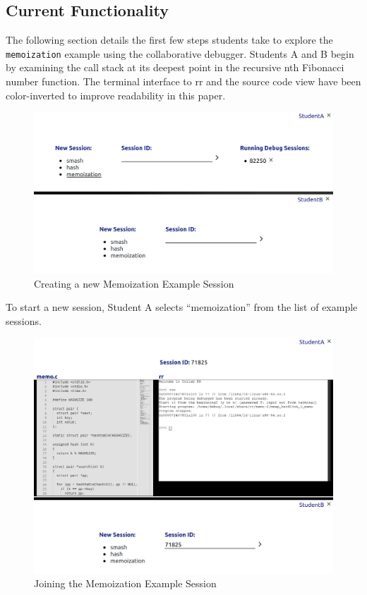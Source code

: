 \documentclass[12pt]{article}
\begin{document}
\subsection{Current Functionality}

The following section details the first few steps students take to
explore the \lstinline{memoization} example using the collaborative
debugger.  Students A and B begin by examining the call stack at its
deepest point in the recursive nth Fibonacci number function.  The
terminal interface to rr and the source code view have been
color-inverted to improve readability in this paper.

\begin{figure}[h!]

  \includegraphics[width=\textwidth]{session1i}
  \centering
  \caption{Creating a new Memoization Example Session}
  \label{session1i}
\end{figure}

To start a new session, Student A selects ``memoization'' from the
list of example sessions.\pagebreak

\begin{figure}[h!]

  \includegraphics[width=\textwidth]{session2i}
  \centering
  \caption{Joining the Memoization Example Session}
  \label{session2i}
\end{figure}
\end{document}
